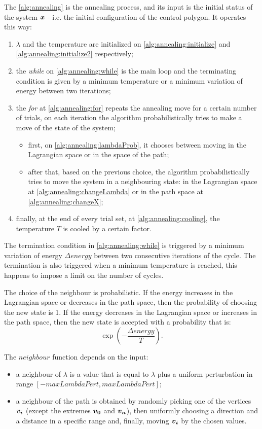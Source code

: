 \documentclass[dissertation.tex]{subfiles}
\begin{document}
The \cref{alg:annealing} is the annealing process, and its input is the
initial status of the system $\boldsymbol{x}$ - i.e. the initial configuration
of the control polygon. It operates this way:
\begin{enumerate}
\item $\lambda$ and the
  temperature are initialized on
  \cref{alg:annealing:initialize} and \cref{alg:annealing:initialize2}
  respectively;
\item the \emph{while} on
  \cref{alg:annealing:while} is the main loop and the terminating
  condition is given by a minimum temperature or a minimum variation of
  energy between two iterations;
\item the \emph{for} at
  \cref{alg:annealing:for} repeats the annealing move for a certain
  number of trials, on each iteration the algorithm probabilistically
  tries to make a move of the state of the system;
  \begin{itemize}
  \item first, on
    \cref{alg:annealing:lambdaProb}, it chooses between moving in the
    Lagrangian space or in the space of the path;
  \item after that, based on the previous
    choice, the algorithm probabilistically tries to move the system
    in a neighbouring
    state: in the
    Lagrangian space at
    \cref{alg:annealing:changeLambda} or in the path space at
    \cref{alg:annealing:changeX};
  \end{itemize}
\item finally, at the end of every trial set,
  at \cref{alg:annealing:cooling}, the temperature $T$ is cooled by
  a certain factor.
\end{enumerate}

The termination condition in \cref{alg:annealing:while} is triggered by a
minimum variation of energy $\Delta energy$ between two consecutive
iterations of the cycle. The termination is also triggered when a
minimum temperature is reached, this happens to impose a limit on the
number of cycles.

The choice of the neighbour is
probabilistic. If the energy increases in the
Lagrangian space or decreases in the path space, then the probability of
choosing the new state is 1. If the energy decreases in the Lagrangian
space or increases in the path space, then the new state is accepted
with a probability that is:
$$\exp(-\frac{\Delta energy}{T}).$$

The $neighbour$ function depends on the input:
\begin{itemize}
  \item a neighbour of $\lambda$ is a value that is equal to $\lambda$
    plus a uniform perturbation in range $[-maxLambdaPert, maxLambdaPert]$;
  \item a neighbour of the path is obtained by randomly picking one of
    the vertices $\boldsymbol{v_i}$ (except the extremes $\boldsymbol{v_0}$ and $\boldsymbol{v_n}$),
    then uniformly choosing a direction and a distance
    in a specific range and, finally, moving $\boldsymbol{v_i}$ by
    the chosen values.
\end{itemize}
\end{document}
